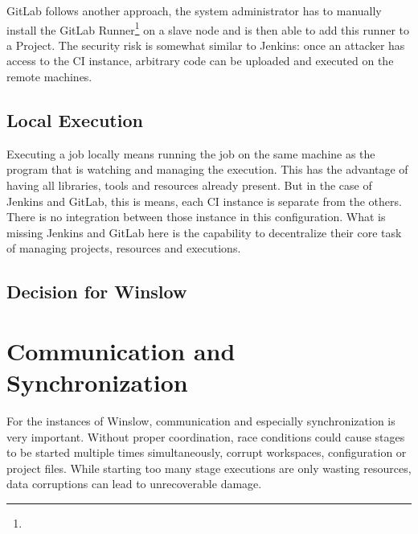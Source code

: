 
GitLab follows another approach, the system administrator has to manually install the GitLab Runner\footnote{} on a slave node and is then able to add this runner to a Project.
The security risk is somewhat similar to Jenkins: once an attacker has access to the CI instance, arbitrary code can be uploaded and executed on the remote machines. 


\subsection{Local Execution}

Executing a job locally means running the job on the same machine as the program that is watching and managing the execution.
This has the advantage of having all libraries, tools and resources already present.
But in the case of Jenkins and GitLab, this is means, each CI instance is separate from the others.
There is no integration between those instance in this configuration.
What is missing Jenkins and GitLab here is the capability to decentralize their core task of managing projects, resources and executions.


\subsection{Decision for Winslow}

\section{Communication and Synchronization}

For the instances of Winslow, communication and especially synchronization is very important.
Without proper coordination, race conditions could cause stages to be started multiple times simultaneously, corrupt workspaces, configuration or project files.
While starting too many stage executions are only wasting resources, data corruptions can lead to unrecoverable damage.

